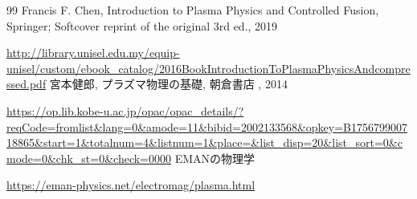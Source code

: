 \documentclass{ltjsarticle}
\numberwithin{equation}{section} %
\begin{document}
\begin{thebibliography}{99}
 Francis F. Chen, Introduction to Plasma Physics and Controlled Fusion, Springer; Softcover reprint of the original 3rd ed., 2019\par
\url{http://library.unisel.edu.my/equip-unisel/custom/ebook_catalog/2016BookIntroductionToPlasmaPhysicsAndcompressed.pdf}
 宮本健郎, プラズマ物理の基礎, 朝倉書店 , 2014\par
\url{https://op.lib.kobe-u.ac.jp/opac/opac_details/?reqCode=fromlist&lang=0&amode=11&bibid=2002133568&opkey=B175679900718865&start=1&totalnum=4&listnum=1&place=&list_disp=20&list_sort=0&cmode=0&chk_st=0&check=0000}
 EMANの物理学\par
\url{https://eman-physics.net/electromag/plasma.html}
\end{thebibliography}
\end{document}
